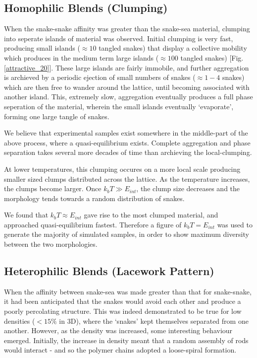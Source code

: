 \documentclass[twocolumn,a4,notitlepage]{article}
\begin{document}
\subsection{Homophilic Blends (Clumping)}
When the snake-snake affinity was greater than the
snake-sea material, clumping into seperate islands of material was observed.
Initial clumping is very fast, producing small islands ($\approx10$ tangled snakes)
that display a collective mobility which produces in the medium term large
islands ($\approx100$ tangled snakes) [Fig. \ref{attractive_20}]. These large islands are fairly
immobile, and further aggregation is archieved by a periodic ejection of
small numbers of snakes ($\approx1-4$ snakes) which are then free to
wander around the lattice, until becoming associated with another island.
This, extremely slow, aggregation eventually produces a full phase
seperation of the material, wherein the small islands eventually
`evaporate', forming one large tangle of snakes.

We believe that experimental samples exist somewhere in the middle-part of
the above process, where a quasi-equilibrium exists. Complete aggregation
and phase separation takes several more decades of time than archieving the
local-clumping.

At lower temperatures, this clumping occures on a more local scale
producing smaller sized clumps distributed across the lattice. As the temperature
increases, the clumps become larger. Once $k_b T \gg E_{int}$, the clump
size decreases and the morphology tends towards a random distribution of
snakes.

We found that $k_b T \approx E_{int}$ gave rise to the most clumped
material, and approached quasi-equilibrium fastest. Therefore a figure of
$k_b T = E_{int}$ was used to generate the majority of simulated samples, in
order to show maximum diversity between the two morphologies.


\subsection{Heterophilic Blends (Lacework Pattern)}
When the affinity between snake-sea was made greater than that for
snake-snake, it had been anticipated that the snakes would avoid each other
and produce a poorly percolating structure. This was indeed demonstrated to
be true for low densities ($<15\%$ in 3D), where the `snakes' kept themselves
separated from one another. However, as the density was increased, some
interesting behaviour emerged. Initially, the increase in density meant that
a random assembly of rods would interact - and so the polymer chains adopted a
loose-spiral formation. 
\end{document}
